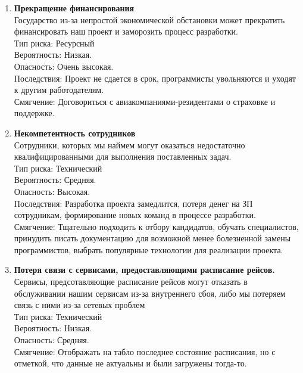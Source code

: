 
\begin{enumerate}
      \item \textbf{Прекращение финансирования} \\
            Государство из-за непростой экономической обстановки может 
            прекратить финансировать наш проект и заморозить процесс разработки. \\
            Тип риска: Ресурсный \\
            Вероятность: Низкая. \\
            Опасность: Очень высокая. \\
            Последствия: Проект не сдается в срок, программисты увольняются и уходят 
            к другим работодателям. \\
            Смягчение: Договориться с авиакомпаниями-резидентами о страховке и поддержке.

      \item \textbf{Некомпетентность сотрудников} \\
            Сотрудники, которых мы наймем могут оказаться недостаточно 
            квалифицированными для выполнения поставленных задач. \\
            Тип риска: Технический \\
            Вероятность: Средняя. \\
            Опасность: Высокая. \\
            Последствия: Разработка проекта замедлится, потеря денег на ЗП
            сотрудникам, формирование новых команд в процессе разработки. \\
            Смягчение: Тщательно подходить к отбору кандидатов, обучать 
            специалистов, принудить писать документацию для возможной менее
            болезненной замены программистов, выбрать популярные технологии
            для реализации проекта.

      \item \textbf{Потеря связи с сервисами, предоставляющими расписание рейсов.} \\
            Сервисы, предсотавляющие расписание рейсов могут отказать
            в обслуживании нашим сервисам из-за внутреннего сбоя,
            либо мы потеряем связь с ними из-за сетевых проблем \\
            Тип риска: Технический \\
            Вероятность: Низкая. \\
            Опасность: Средняя. \\
            Смягчение: Отображать на табло последнее состояние расписания, но с
            отметкой, что данные не актуальны и были загружены тогда-то.


\end{enumerate}
